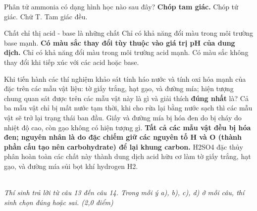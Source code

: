 \documentclass[11pt,a4paper]{article}
\begin{document}
\begin{ex}
Phân tử ammonia có dạng hình học nào sau đây?
\choice
{\textbf{\color{hfRed}Chóp tam giác.}}
{Chóp tứ giác.}
{Chữ T.}
{Tam giác đều.}
\end{ex}
\begin{ex}
Chất chỉ thị acid - base là những chất
\choice
{Chỉ có khả năng đổi màu trong môi trường base mạnh.}
{\textbf{\color{hfRed}Có màu sắc thay đổi tùy thuộc vào giá trị pH của dung dịch.}}
{Chỉ có khả năng đổi màu trong môi trường acid mạnh.}
{Có màu sắc không thay đổi khi tiếp xúc với các acid hoặc base.}
\end{ex}
\begin{ex}
Khi tiến hành các thí nghiệm khảo sát tính háo nước và tính oxi hóa mạnh của  đặc trên các mẫu vật liệu: tờ giấy trắng, hạt gạo, và đường mía; hiện tượng chung quan sát được trên các mẫu vật này là gì và giải thích \textbf{đúng nhất} là?
\choice
{Cả ba mẫu vật chỉ bị mất nước tạm thời, khi cho rửa lại bằng nước sạch thì các mẫu vật sẽ trở lại trạng thái ban đầu.}
{Giấy và đường mía bị hóa đen do bị cháy do nhiệt độ cao, còn gạo không có hiện tượng gì.}
{\textbf{\color{hfRed}Tất cả các mẫu vật đều bị hóa đen; nguyên nhân là do  đặc chiếm giữ các nguyên tố H và O (thành phần cấu tạo nên carbohydrate) để lại khung carbon.}}
{H2SO4 đặc thủy phân hoàn toàn các chất này thành dung dịch acid hữu cơ làm tờ giấy trắng, hạt gạo, và đường mía sủi bọt khí hydrogen H2.}
\end{ex}

\vspace{6pt}
 \\
\textit{Thí sinh trả lời từ câu 13 đến câu 14. Trong mỗi ý a), b), c), d) ở mỗi câu, thí sinh chọn đúng hoặc sai. (2,0 điểm)}
\vspace{4pt}
\end{document}
